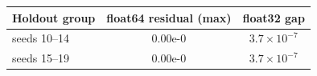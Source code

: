 {\small\begin{tabular}{lcc}\hline
Holdout group & float64 residual (max) & float32 gap \\\hline
seeds 10--14 & 0.00e-0 & $3.7\times10^{-7}$ \\
seeds 15--19 & 0.00e-0 & $3.7\times10^{-7}$ \\
\hline\end{tabular}}
